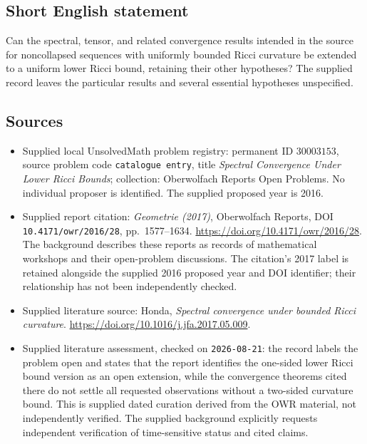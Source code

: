 \documentclass[11pt]{article}
\begin{document}
\subsection{Short English statement}
Can the spectral, tensor, and related convergence results intended in the source for noncollapsed sequences with uniformly bounded Ricci curvature be extended to a uniform lower Ricci bound, retaining their other hypotheses? The supplied record leaves the particular results and several essential hypotheses unspecified.
\subsection{Sources}
\begin{itemize}
\item Supplied local UnsolvedMath problem registry: permanent ID \(30003153\), source problem code \texttt{catalogue entry}, title \emph{Spectral Convergence Under Lower Ricci Bounds}; collection: Oberwolfach Reports Open Problems. No individual proposer is identified. The supplied proposed year is 2016.
\item Supplied report citation: \emph{Geometrie (2017)}, Oberwolfach Reports, DOI \texttt{10.4171/owr/2016/28}, pp.\ 1577--1634. \url{https://doi.org/10.4171/owr/2016/28}. The background describes these reports as records of mathematical workshops and their open-problem discussions. The citation's 2017 label is retained alongside the supplied 2016 proposed year and DOI identifier; their relationship has not been independently checked.
\item Supplied literature source: Honda, \emph{Spectral convergence under bounded Ricci curvature}. \url{https://doi.org/10.1016/j.jfa.2017.05.009}.
\item Supplied literature assessment, checked on \texttt{2026-08-21}: the record labels the problem open and states that the report identifies the one-sided lower Ricci bound version as an open extension, while the convergence theorems cited there do not settle all requested observations without a two-sided curvature bound. This is supplied dated curation derived from the OWR material, not independently verified. The supplied background explicitly requests independent verification of time-sensitive status and cited claims.
\end{itemize}
\end{document}
